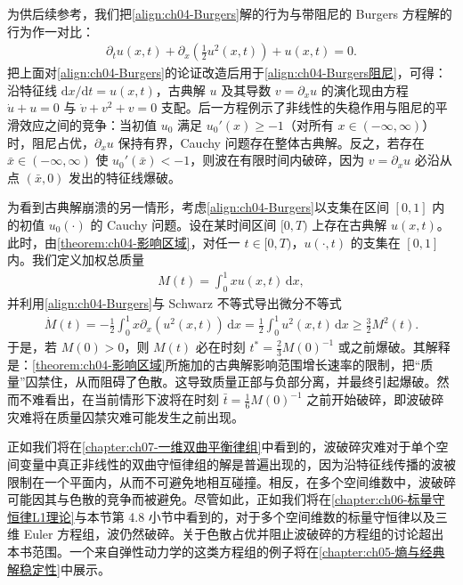 ﻿\documentclass[../../main.tex]{subfiles}
\begin{document}
为供后续参考，我们把\eqref{align:ch04-Burgers}解的行为与带阻尼的 Burgers 方程解的行为作一对比：
\begin{align}
\partial_{t}u(x,t)+\partial_{x}\left(\tfrac{1}{2}u^{2}(x,t)\right)+u(x,t)=0.
\label{align:ch04-Burgers阻尼}
\end{align}
把上面对\eqref{align:ch04-Burgers}的论证改造后用于\eqref{align:ch04-Burgers阻尼}，可得：沿特征线 $\mathrm{d}x/\mathrm{d}t=u(x,t)$，古典解 $u$ 及其导数 $v=\partial_{x}u$ 的演化现由方程 $\dot{u}+u=0$ 与 $\dot{v}+v^{2}+v=0$ 支配。后一方程例示了非线性的失稳作用与阻尼的平滑效应之间的竞争：当初值 $u_{0}$ 满足 $u_{0}'(x)\geqslant -1$（对所有 $x\in(-\infty,\infty)$）时，阻尼占优，$\partial_{x}u$ 保持有界，Cauchy 问题存在整体古典解。反之，若存在 $\bar{x}\in(-\infty,\infty)$ 使 $u_{0}'(\bar{x})<-1$，则波在有限时间内破碎，因为 $v=\partial_{x}u$ 必沿从点 $(\bar{x},0)$ 发出的特征线爆破。

为看到古典解崩溃的另一情形，考虑\eqref{align:ch04-Burgers}以支集在区间 $[0,1]$ 内的初值 $u_{0}(\cdot)$ 的 Cauchy 问题。设在某时间区间 $[0,T)$ 上存在古典解 $u(x,t)$。此时，由\cref{theorem:ch04-影响区域}，对任一 $t\in[0,T)$，$u(\cdot,t)$ 的支集在 $[0,1]$ 内。我们定义加权总质量
\begin{align}
M(t)=\int_{0}^{1}xu(x,t)\,\mathrm{d}x,
\label{align:ch04-加权质量}
\end{align}
并利用\eqref{align:ch04-Burgers}与 Schwarz 不等式导出微分不等式
\begin{align}
\dot{M}(t)=-\tfrac{1}{2}\int_{0}^{1}x\partial_{x}(u^{2}(x,t))\,\mathrm{d}x=\tfrac{1}{2}\int_{0}^{1}u^{2}(x,t)\,\mathrm{d}x\geqslant\tfrac{3}{2}M^{2}(t).
\label{align:ch04-M微分不等式}
\end{align}
于是，若 $M(0)>0$，则 $M(t)$ 必在时刻 $t^{*}=\tfrac{2}{3}M(0)^{-1}$ 或之前爆破。其解释是：\cref{theorem:ch04-影响区域}所施加的古典解影响范围增长速率的限制，把“质量”囚禁住，从而阻碍了色散。这导致质量正部与负部分离，并最终引起爆破。然而不难看出，在当前情形下波将在时刻 $\bar{t}=\tfrac{1}{6}M(0)^{-1}$ 之前开始破碎，即波破碎灾难将在质量囚禁灾难可能发生之前出现。

正如我们将在\cref{chapter:ch07-一维双曲平衡律组}中看到的，波破碎灾难对于单个空间变量中真正非线性的双曲守恒律组的解是普遍出现的，因为沿特征线传播的波被限制在一个平面内，从而不可避免地相互碰撞。相反，在多个空间维数中，波破碎可能因其与色散的竞争而被避免。尽管如此，正如我们将在\cref{chapter:ch06-标量守恒律L1理论}与本节第 4.8 小节中看到的，对于多个空间维数的标量守恒律以及三维 Euler 方程组，波仍然破碎。关于色散占优并阻止波破碎的方程组的讨论超出本书范围。一个来自弹性动力学的这类方程组的例子将在\cref{chapter:ch05-熵与经典解稳定性}中展示。
\end{document}
